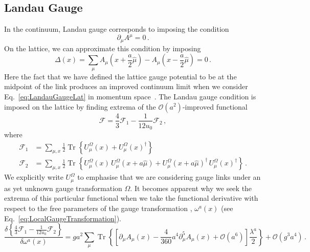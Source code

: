 \subsection{Landau Gauge}\label{sec:LandauGauge}

In the continuum, Landau gauge corresponds to imposing the condition
\begin{equation}
\partial_\mu A^\mu = 0\, .
\label{eq:LandauGaugeCont}
\end{equation}
%
On the lattice, we can approximate this condition by imposing
\begin{equation}
\Delta(x) = \sum _ { \mu } A _ { \mu } \left( x + \frac{a}{2}\hat { \mu } \right) - A _ { \mu } \left( x-\frac{a}{2}\hat { \mu } \right) = 0\, .
\label{eq:LandauGaugeLat}
\end{equation}
Here the fact that we have defined the lattice gauge potential to be at the midpoint of the link produces an improved continuum limit when we consider Eq.~\eqref{eq:LandauGaugeLat} in momentum space~\cite{Alles:1996ka}. The Landau gauge condition is imposed on the lattice by finding extrema of the $\mathcal{O}(a^2)$-improved functional~\cite{Bonnet:1999mj}
%
\begin{equation}
\mathcal{F} =  \frac{4}{3}\mathcal{F}_1 - \frac{1}{12u_0}\mathcal{F}_2\, ,
\label{eq:LGFunctional}
\end{equation}
%
where
%
\begin{align}
\mathcal{F}_1 &= \sum _ { \mu , x } \frac { 1 } { 2 } \operatorname { Tr } \left\{ U _ { \mu } ^ { \Omega } ( x ) + U _ { \mu } ^ { \Omega } ( x ) ^ { \dagger } \right\}\\
\mathcal{F}_2 &= \sum _ { \mu , x } \frac { 1 } { 2 } \operatorname { Tr } \left\{ U _ { \mu } ^ { \Omega } ( x ) \,U _ { \mu } ^ { \Omega } ( x + a\hat { \mu } ) + U _ { \mu } ^ { \Omega } ( x + a\hat { \mu } )^\dagger\, U _ { \mu } ^ { \Omega } ( x )^\dagger  \right\}\, .
\end{align}
%
We explicitly write $U^\Omega_\mu$ to emphasise that we are considering gauge links under an as yet unknown gauge transformation $\Omega$. It becomes apparent why we seek the extrema of this particular functional when we take the functional derivative with respect to the free parameters of the gauge transformation , $\omega^a(x)$ (see Eq.~\eqref{eq:LocalGaugeTransformation}).
%
\begin{equation}
\frac { \delta \left\{ \frac { 4 } { 3 } \mathcal { F } _ { 1 } - \frac { 1 } { 12 u _ { 0 } } \mathcal { F } _ { 2 } \right\} } { \delta \omega ^ { a } ( x ) } = g a ^ { 2 } \sum _ { \mu } \operatorname { Tr } \left\{ \left[ \partial _ { \mu } A _ { \mu } ( x ) - \frac { 4 } { 360 } a ^ { 4 } \partial _ { \mu } ^ { 5 } A _ { \mu } ( x ) + \mathcal { O } \left( a ^ { 6 } \right) \right] \frac{\lambda^a}{2} \right\} + \mathcal { O } \left( g ^ { 3 } a ^ { 4 } \right)\, .
\label{eq:LGFunctionalDeriv}
\end{equation}
